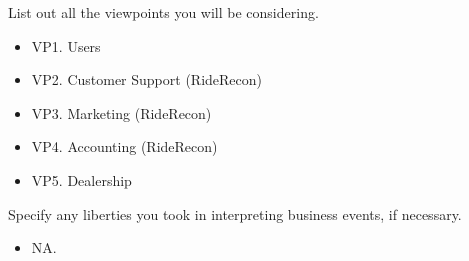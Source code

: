 \documentclass[]{article}
\begin{document}
 List out all the viewpoints you will be considering.\\
\begin{itemize}
	\item VP1. Users
	\item VP2. Customer Support (RideRecon)
	\item VP3. Marketing (RideRecon)
	\item VP4. Accounting (RideRecon)
	\item VP5. Dealership
\end{itemize}

 Specify any liberties you took in interpreting business events, if necessary.
\begin{itemize}
	\item NA.
\end{itemize}
\end{document}
